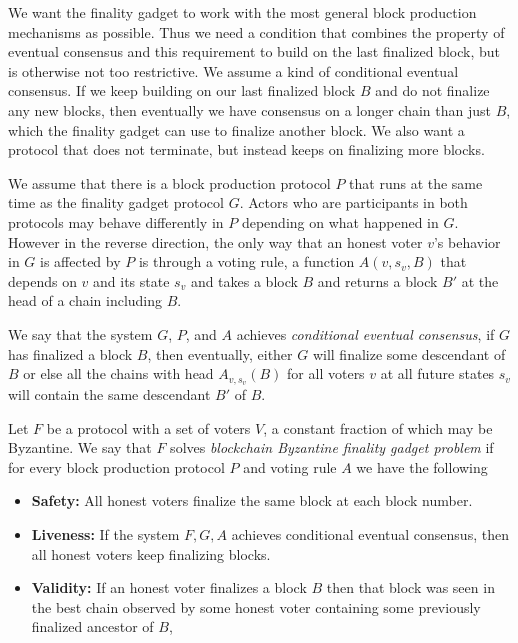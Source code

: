 \documentclass[a4paper,UKenglish,cleveref, autoref, thm-restate, anonymous]{lipics-v2019}
\begin{document}
We want the finality gadget to work with the most general block production mechanisms as possible. Thus we need a condition that combines the property of eventual consensus and this requirement to build on the last finalized block, but is otherwise not too restrictive.
We assume a kind of conditional eventual consensus.
If we keep building on our last finalized block $B$ and do not finalize any new blocks, then eventually we have consensus on a longer chain than just $B$, which the finality gadget can use to finalize another block.
We also want a protocol that does not terminate, but instead keeps on finalizing more blocks. 

We assume that there is a block production protocol $P$ that runs at the same time as the finality gadget protocol $G$. Actors who are participants in both protocols may behave differently in $P$ depending on what happened in $G$.
However in the reverse direction, the only way that an honest voter $v$'s behavior in $G$ is affected by $P$ is through a voting rule, a function $A(v,s_v, B)$ that depends on $v$ and its state $s_v$ and takes a block $B$ and returns a block $B'$ at the head of a chain including $B$.

We say that the system $G$, $P$, and $A$ achieves {\em conditional eventual consensus}, if $G$ has finalized a block $B$, then eventually, either $G$ will finalize some descendant of $B$ or else all the chains with head $A_{v,s_v}(B)$ for all voters $v$ at all future states $s_v$ will contain the same descendant $B'$ of $B$.

\begin{definition} \label{def:finality-gadget} 
Let $F$ be a protocol with a set of voters $V$, a constant fraction of which may be Byzantine.
We say that $F$ solves {\em blockchain Byzantine finality gadget problem} if for every block production protocol $P$ and voting rule $A$ we have the following


\begin{itemize}
\item{\bf Safety:} All honest voters finalize the same block at each block number.
\item{\bf Liveness:} If the system $F, G, A$ achieves conditional eventual consensus, then all honest voters keep finalizing blocks.
\item{\bf Validity:} If an honest voter finalizes a block $B$ then that block was seen in the best chain observed by some honest voter containing some previously finalized ancestor of $B$,
\end{itemize}

\end{definition}
\end{document}
